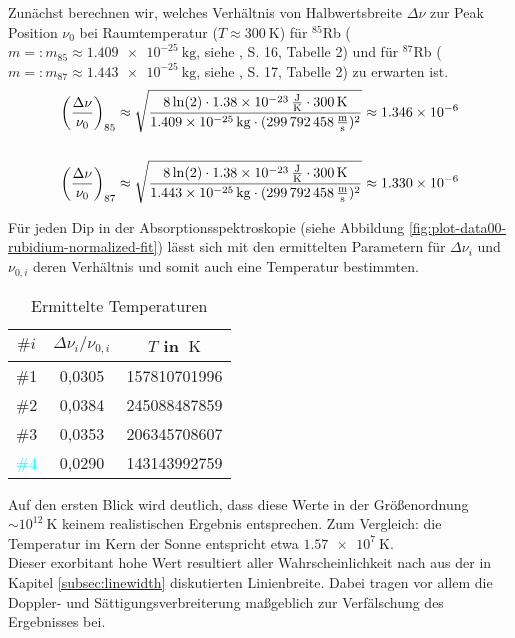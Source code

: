 \noindent Zunächst berechnen wir, welches Verhältnis von Halbwertsbreite $\Delta \nu$ zur Peak Position $\nu_{0}$ bei Raumtemperatur ($T \approx \SI{300}{\kelvin}$) für $^{85}$Rb ($m =: m_{85} \approx \SI{1,409e-25}{\kilogram}$, siehe \cite{Steck85}, S. 16, Tabelle 2) und für $^{87}$Rb ($m =: m_{87} \approx \SI{1,443e-25}{\kilogram}$, siehe \cite{Steck87}, S. 17, Tabelle 2) zu erwarten ist.
\begin{align*}
    \biggl(\frac{\Delta \nu}{\nu_{0}}\biggr)_{85} & \approx \sqrt{\frac{8 \ln(2) \cdot  \SI{1,38e-23}{\frac{\joule}{\kelvin} \cdot \SI{300}{\kelvin}}}{\SI{1,409e-25}{\kilogram} \cdot (\SI{299792458}{\frac{\meter}{\second}})^2}} \approx \SI{1,346e-6}{}\\ \\
    \biggl(\frac{\Delta \nu}{\nu_{0}}\biggr)_{87} & \approx \sqrt{\frac{8 \ln(2) \cdot  \SI{1,38e-23}{\frac{\joule}{\kelvin} \cdot \SI{300}{\kelvin}}}{\SI{1,443e-25}{\kilogram} \cdot (\SI{299792458}{\frac{\meter}{\second}})^2}} \approx \SI{1,330e-6}{}
\end{align*}

\noindent Für jeden Dip in der Absorptionsspektroskopie (siehe Abbildung \ref{fig:plot-data00-rubidium-normalized-fit}) lässt sich mit den ermittelten Parametern für $\Delta \nu_{i}$ und $\nu_{0,i}$ deren Verhältnis und somit auch eine Temperatur bestimmten.

\begin{table}[!h]
    \centering
    \begin{tabular}{|c|c|c|}
        \hline
        $\#i$   &   $\Delta \nu_{i}/\nu_{0,i}$   &   $T$ in $\SI{}{\kelvin}$     \\
        \hline
        \hline 
         \textcolor{red!80!black}{\#1}      &     0,0305      &        157810701996        \\
        \hline
         \textcolor{green!50!black}{\#2}    &     0,0384      &        245088487859        \\
        \hline
         \textcolor{pink!50!purple}{\#3}    &     0,0353      &        206345708607        \\
        \hline 
         \textcolor{cyan}{\#4}              &     0,0290      &        143143992759        \\
        \hline 
    \end{tabular}
    \caption{Ermittelte Temperaturen}
    \label{tab:temperatures}
\end{table}

\noindent Auf den ersten Blick wird deutlich, dass diese Werte in der Größenordnung $\sim 10^{12}\SI{}{\kelvin}$ keinem realistischen Ergebnis entsprechen. Zum Vergleich: die Temperatur im Kern der Sonne entspricht etwa 
\href{https://www.wolframalpha.com/input/?i=temperature+core+of+the+sun}{$\SI{1,57e7}{\kelvin}$}. \\
\noindent Dieser exorbitant hohe Wert resultiert aller Wahrscheinlichkeit nach aus der in Kapitel \ref{subsec:linewidth} diskutierten Linienbreite. Dabei tragen vor allem die Doppler- und Sättigungsverbreiterung maßgeblich zur Verfälschung des Ergebnisses bei.

